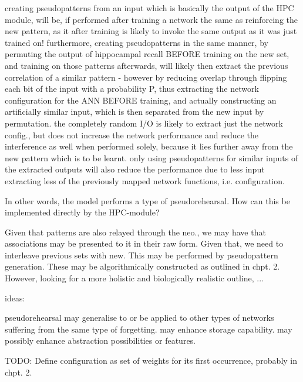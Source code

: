 creating pseudopatterns from an input which is basically the output of the HPC module, will be, if performed after training a network the same as reinforcing the new pattern, as it after training is likely to invoke the same output as it was just trained on!
furthermore, creating pseudopatterns in the same manner, by permuting the output of hippocampal recall BEFORE training on the new set, and training on those patterns afterwards, will likely then extract the previous correlation of a similar pattern - however by reducing overlap through flipping each bit of the input with a probability P, thus extracting the network configuration for the ANN BEFORE training, and actually constructing an artificially similar input, which is then separated from the new input by permutation. the completely random I/O is likely to extract just the network config., but does not increase the network performance and reduce the interference as well when performed solely, because it lies further away from the new pattern which is to be learnt. only using pseudopatterns for similar inputs of the extracted outputs will also reduce the performance due to less input extracting less of the previously mapped network functions, i.e. configuration.

In other words, the model performs a type of pseudorehearsal. How can this be implemented directly by the HPC-module?

Given that patterns are also relayed through the neo., we may have that associations may be presented to it in their raw form. Given that, we need to interleave previous sets with new. This may be performed by pseudopattern generation. These may be algorithmically constructed as outlined in chpt. 2. However, looking for a more holistic and biologically realistic outline, ...

ideas: 

pseudorehearsal may generalise to or be applied to other types of networks suffering from the same type of forgetting. may enhance storage capability. may possibly enhance abstraction possibilities or features.

TODO: Define configuration as set of weights for its first occurrence, probably in chpt. 2.

